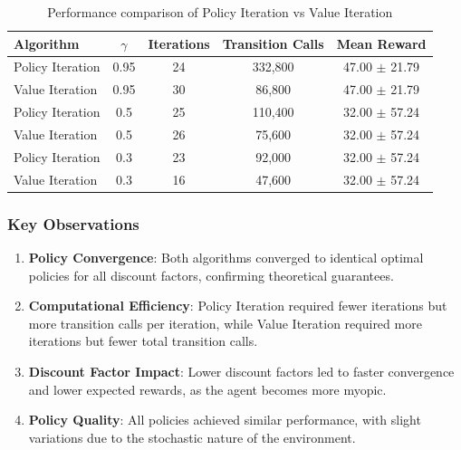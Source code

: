 \documentclass[12pt]{article}
\begin{document}
\begin{table}[H]
\centering
\caption{Performance comparison of Policy Iteration vs Value Iteration}
\begin{tabular}{lcccc}
\toprule
Algorithm & $\gamma$ & Iterations & Transition Calls & Mean Reward \\
\midrule
Policy Iteration & 0.95 & 24 & 332,800 & 47.00 $\pm$ 21.79 \\
Value Iteration & 0.95 & 30 & 86,800 & 47.00 $\pm$ 21.79 \\
Policy Iteration & 0.5 & 25 & 110,400 & 32.00 $\pm$ 57.24 \\
Value Iteration & 0.5 & 26 & 75,600 & 32.00 $\pm$ 57.24 \\
Policy Iteration & 0.3 & 23 & 92,000 & 32.00 $\pm$ 57.24 \\
Value Iteration & 0.3 & 16 & 47,600 & 32.00 $\pm$ 57.24 \\
\bottomrule
\end{tabular}
\end{table}

\subsubsection{Key Observations}

\begin{enumerate}
    \item \textbf{Policy Convergence}: Both algorithms converged to identical optimal policies for all discount factors, confirming theoretical guarantees.
    
    \item \textbf{Computational Efficiency}: Policy Iteration required fewer iterations but more transition calls per iteration, while Value Iteration required more iterations but fewer total transition calls.
    
    \item \textbf{Discount Factor Impact}: Lower discount factors led to faster convergence and lower expected rewards, as the agent becomes more myopic.
    
    \item \textbf{Policy Quality}: All policies achieved similar performance, with slight variations due to the stochastic nature of the environment.
\end{enumerate}
\end{document}
